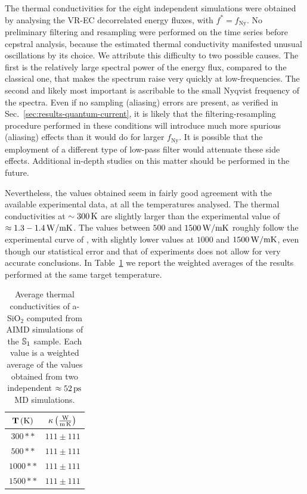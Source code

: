 The \abinitio thermal conductivities for the eight independent simulations were obtained by analysing the VR-EC decorrelated energy fluxes, with $f^*=f_\mathrm{Ny}$. 
No preliminary filtering and resampling were performed on the time series before cepstral analysis, because the estimated thermal conductivity manifested unusual oscillations by its choice. We attribute this difficulty to two possible causes. 
The first is the relatively large spectral power of the \abinitio energy flux, compared to the classical one, that makes the spectrum raise very quickly at low-frequencies. 
The second and likely most important is ascribable to the small Nyqvist frequency of the \abinitio spectra. Even if no sampling (aliasing) errors are present, as verified in Sec.~\ref{sec:results-quantum-current}, it is likely that the filtering-resampling procedure performed in these conditions will introduce much more spurious (aliasing) effects than it would do for larger $f_\mathrm{Ny}$. 
It is possible that the employment of a different type of low-pass filter would attenuate these side effects. 
Additional in-depth studies on this matter should be performed in the future. 

Nevertheless, the values obtained seem in fairly good agreement with the available experimental data, at all the temperatures analysed. 
The thermal conductivities at $\sim 300\,\mathrm{K}$ are slightly larger than the experimental value of $\approx 1.3-1.4\,\mathrm{W/mK}$. 
The values between $500$ and $1500\,\mathrm{W/mK}$ roughly follow the experimental curve of \citet{Cahill1990}, with slightly lower values at $1000$ and $1500\,\mathrm{W/mK}$, even though our statistical error and that of experiments does not allow for very accurate conclusions. 
In Table~\ref{tab:results-quantum-wkappa} we report the weighted averages of the \abinitio results performed at the same target temperature.

\begin{table}[!tb]
    \centering
    \begin{tabular}{c|c}
        $\mathbf{T}\,\mathrm{(K)}$ & $\mathbf{\kappa}\,\mathrm{\left(\frac{W}{m\,K}\right)}$ \\
        \hline
        $300**$ & $111 \pm 111$ \\
        $500**$ & $111 \pm 111$ \\
        $1000**$ & $111 \pm 111$ \\
        $1500**$ & $111 \pm 111$ \\
    \end{tabular}
    \caption{Average thermal conductivities of a-SiO$_2$ computed from AIMD simulations of the $\S1$ sample. Each value is a weighted average of the values obtained from two independent $\approx 52\,\mathrm{ps}$ MD simulations.}
    \label{tab:results-quantum-wkappa}
\end{table}

